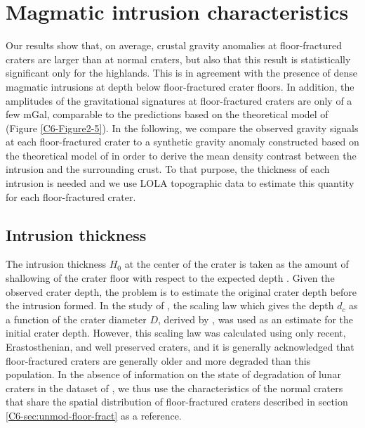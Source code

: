 \section{Magmatic intrusion characteristics}
\label{C6-sec:magm-intr-char}
  
Our  results  show that,  on  average,  crustal gravity  anomalies  at
floor-fractured craters  are larger than  at normal craters,  but also
that   this  result   is  statistically   significant  only   for  the
highlands. This  is in agreement  with the presence of  dense magmatic
intrusions at depth below floor-fractured crater floors.  In addition,
the  amplitudes of  the  gravitational  signatures at  floor-fractured
craters are only of a few mGal, comparable to the predictions based on
the    theoretical    model     of    \citet{Thorey:2014cv}    (Figure
\ref{C6-Figure2-5}).  In  the following, we compare  the observed gravity
signals at each floor-fractured crater  to a synthetic gravity anomaly
constructed based on the theoretical model of \citet{Thorey:2014cv} in
order to  derive the mean  density contrast between the  intrusion and
the  surrounding  crust.   To  that purpose,  the  thickness  of  each
intrusion is needed and we use  LOLA topographic data to estimate this
quantity for each floor-fractured crater.

\subsection{Intrusion thickness}
\label{C6-sec:intrusion-thickness}

The intrusion thickness $H_0$ at the  center of the crater is taken as
the  amount of  shallowing of  the crater  floor with  respect to  the
expected   depth  \citep{Schultz:1976kt,Jozwiak:2012dq}.    Given  the
observed crater depth, the problem  is to estimate the original crater
depth   before    the   intrusion    formed.    In   the    study   of
\citet{Jozwiak:2012dq}, the scaling law which gives the depth $d_c$ as
a function of the crater diameter $D$, derived by \citet{Pike:1974ux},
was used as  an estimate for the initial crater  depth.  However, this
scaling law was calculated using only recent, Erastosthenian, and well
preserved   craters,   and   it   is   generally   acknowledged   that
floor-fractured  craters are  generally older  and more  degraded than
this  population.  In  the  absence  of information  on  the state  of
degradation of lunar craters in the dataset of \citet{Head:2010fy}, we
thus  use the  characteristics of  the normal  craters that  share the
spatial distribution  of floor-fractured craters described  in section
\ref{C6-sec:unmod-floor-fract} as a reference.

